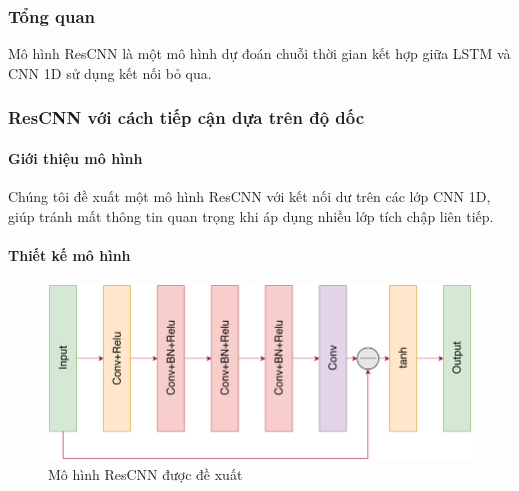 \documentclass[conference]{IEEEtran}
\begin{document}
\subsubsection{Tổng quan}
Mô hình ResCNN là một mô hình dự đoán chuỗi thời gian kết hợp giữa LSTM và CNN 1D sử dụng kết nối bỏ qua.

\subsubsection{ResCNN với cách tiếp cận dựa trên độ dốc}
\paragraph{Giới thiệu mô hình}
Chúng tôi đề xuất một mô hình ResCNN với kết nối dư trên các lớp CNN 1D, giúp tránh mất thông tin quan trọng khi áp dụng nhiều lớp tích chập liên tiếp.

\paragraph{Thiết kế mô hình}
\begin{figure}[H]
    \centering
    \begin{minipage}{0.43\textwidth}
        \centering
        \includegraphics[width=1\textwidth]{bibliography/figure/ResCNN/ResCNN_1.png}
        \caption{Mô hình ResCNN được đề xuất}
        \label{fig:gru_del_up}
    \end{minipage}
\end{figure}
\end{document}

